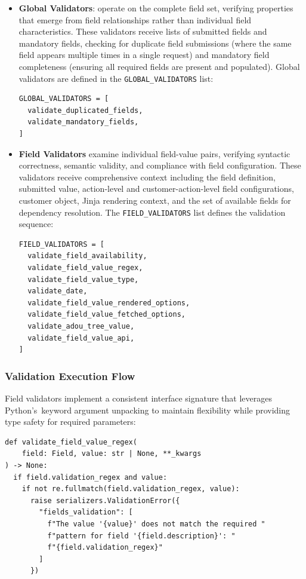\begin{itemize}
  \item \textbf{Global Validators}: operate on the complete field set, verifying properties that emerge from field relationships rather than individual field characteristics. These validators receive lists of submitted fields and mandatory fields, checking for duplicate field submissions (where the same field appears multiple times in a single request) and mandatory field completeness (ensuring all required fields are present and populated). Global validators are defined in the \texttt{GLOBAL\_VALIDATORS} list:
    \begin{verbatim}
GLOBAL_VALIDATORS = [
  validate_duplicated_fields,
  validate_mandatory_fields,
]
  \end{verbatim}
  \item \textbf{Field Validators} examine individual field-value pairs, verifying syntactic correctness, semantic validity, and compliance with field configuration. These validators receive comprehensive context including the field definition, submitted value, action-level and customer-action-level field configurations, customer object, Jinja rendering context, and the set of available fields for dependency resolution. The \texttt{FIELD\_VALIDATORS} list defines the validation sequence:
  \begin{verbatim}
FIELD_VALIDATORS = [
  validate_field_availability,
  validate_field_value_regex,
  validate_field_value_type,
  validate_date,
  validate_field_value_rendered_options,
  validate_field_value_fetched_options,
  validate_adou_tree_value,
  validate_field_value_api,
]
  \end{verbatim}
\end{itemize}

\subsubsection{Validation Execution Flow}

Field validators implement a consistent interface signature that leverages Python's~keyword argument unpacking to maintain flexibility while providing type safety for required parameters:

\begin{verbatim}
def validate_field_value_regex(
    field: Field, value: str | None, **_kwargs
) -> None:
  if field.validation_regex and value:
    if not re.fullmatch(field.validation_regex, value):
      raise serializers.ValidationError({
        "fields_validation": [
          f"The value '{value}' does not match the required "
          f"pattern for field '{field.description}': "
          f"{field.validation_regex}"
        ]
      })
\end{verbatim}

